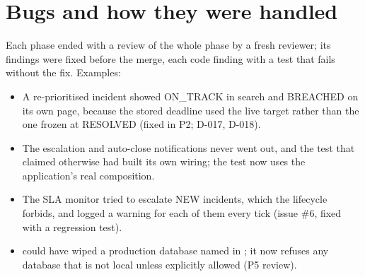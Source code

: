 \section{Bugs and how they were handled}
Each phase ended with a review of the whole phase by a fresh reviewer; its findings were fixed
before the merge, each code finding with a test that fails without the fix. Examples:
\begin{itemize}
  \item A re-prioritised incident showed ON\_TRACK in search and BREACHED on its own page,
    because the stored deadline used the live target rather than the one frozen at RESOLVED
    (fixed in P2; D-017, D-018).
  \item The escalation and auto-close notifications never went out, and the test that claimed
    otherwise had built its own wiring; the test now uses the application's real composition.
  \item The SLA monitor tried to escalate NEW incidents, which the lifecycle forbids, and logged
    a warning for each of them every tick (issue \#6, fixed with a regression test).
  \item {} could have wiped a production database named in ; it
    now refuses any database that is not local unless explicitly allowed (P5 review).
\end{itemize}

